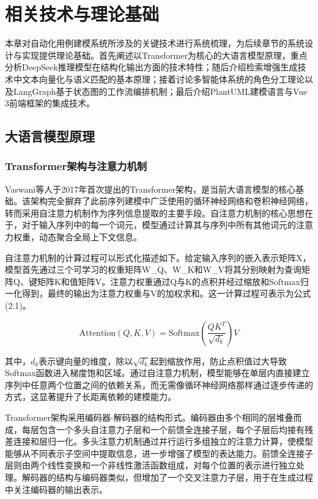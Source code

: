 \chapter{相关技术与理论基础}
\vspace{7pt}

本章对自动化用例建模系统所涉及的关键技术进行系统梳理，为后续章节的系统设计与实现提供理论基础。首先阐述以Transformer为核心的大语言模型原理，重点分析DeepSeek推理模型在结构化输出方面的技术特性；随后介绍检索增强生成技术中文本向量化与语义匹配的基本原理；接着讨论多智能体系统的角色分工理论以及LangGraph基于状态图的工作流编排机制；最后介绍PlantUML建模语言与Vue 3前端框架的集成技术。

\section{大语言模型原理}

\subsection{Transformer架构与注意力机制}

Vaswani等人\cite{vaswani2017attention}于2017年首次提出的Transformer架构，是当前大语言模型的核心基础。该架构完全摒弃了此前序列建模中广泛使用的循环神经网络和卷积神经网络，转而采用自注意力机制作为序列信息提取的主要手段。自注意力机制的核心思想在于，对于输入序列中的每一个词元，模型通过计算其与序列中所有其他词元的注意力权重，动态聚合全局上下文信息。

自注意力机制的计算过程可以形式化描述如下。给定输入序列的嵌入表示矩阵X，模型首先通过三个可学习的权重矩阵W\_Q、W\_K和W\_V将其分别映射为查询矩阵Q、键矩阵K和值矩阵V。注意力权重通过Q与K的点积并经过缩放和Softmax归一化得到，最终的输出为注意力权重与V的加权求和。这一计算过程可表示为公式(2.1)。

\begin{equation}
    \text{Attention}(Q, K, V) = \text{Softmax}\left(\frac{QK^T}{\sqrt{d_k}}\right)V
    \label{eq:attention}
\end{equation}

其中，$d_k$表示键向量的维度，除以$\sqrt{d_k}$起到缩放作用，防止点积值过大导致Softmax函数进入梯度饱和区域。通过自注意力机制，模型能够在单层内直接建立序列中任意两个位置之间的依赖关系，而无需像循环神经网络那样通过逐步传递的方式，这显著提升了长距离依赖的建模能力。

Transformer架构采用编码器-解码器的结构形式。编码器由多个相同的层堆叠而成，每层包含一个多头自注意力子层和一个前馈全连接子层，每个子层后均接有残差连接和层归一化。多头注意力机制通过并行运行多组独立的注意力计算，使模型能够从不同表示子空间中提取信息，进一步增强了模型的表达能力。前馈全连接子层则由两个线性变换和一个非线性激活函数组成，对每个位置的表示进行独立处理。解码器的结构与编码器类似，但增加了一个交叉注意力子层，用于在生成过程中关注编码器的输出表示。

